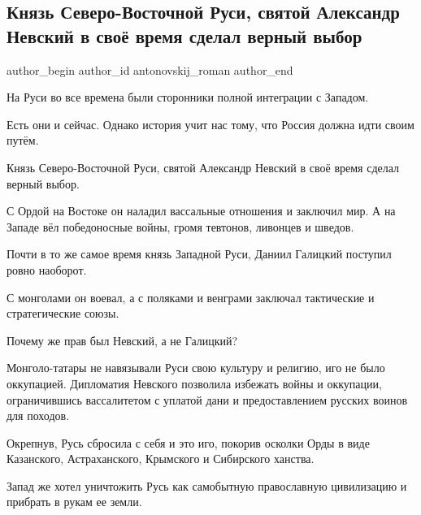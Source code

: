  
 
 
 
 
 
\subsection{Князь Северо-Восточной Руси, святой Александр Невский в своё время сделал верный выбор}
\label{sec:18_06_2021.fb.antonovskij_roman.1.aleksandr_nevskij}
\ifcmt
 author_begin
   author_id antonovskij_roman
 author_end
\fi

На Руси во все времена были сторонники полной интеграции с Западом. 

Есть они и сейчас. Однако история учит нас тому, что Россия должна идти своим путём. 

Князь Северо-Восточной Руси, святой Александр Невский в своё время сделал верный выбор. 

С Ордой на Востоке он наладил вассальные отношения и заключил мир. А на Западе
вёл победоносные войны, громя тевтонов, ливонцев и шведов. 

Почти в то же самое время князь Западной Руси, Даниил Галицкий поступил ровно наоборот. 

С монголами он воевал, а с поляками и венграми заключал тактические и стратегические союзы. 

Почему же прав был Невский, а не Галицкий? 

Монголо-татары не навязывали Руси свою культуру и религию, иго не было
оккупацией. Дипломатия Невского позволила избежать войны и оккупации,
ограничившись вассалитетом с уплатой дани и предоставлением русских воинов для
походов.  

Окрепнув, Русь сбросила с себя и это иго, покорив осколки Орды в виде
Казанского, Астраханского, Крымского и Сибирского ханства. 

Запад же хотел уничтожить Русь как самобытную православную цивилизацию и прибрать в рукам ее земли.  

